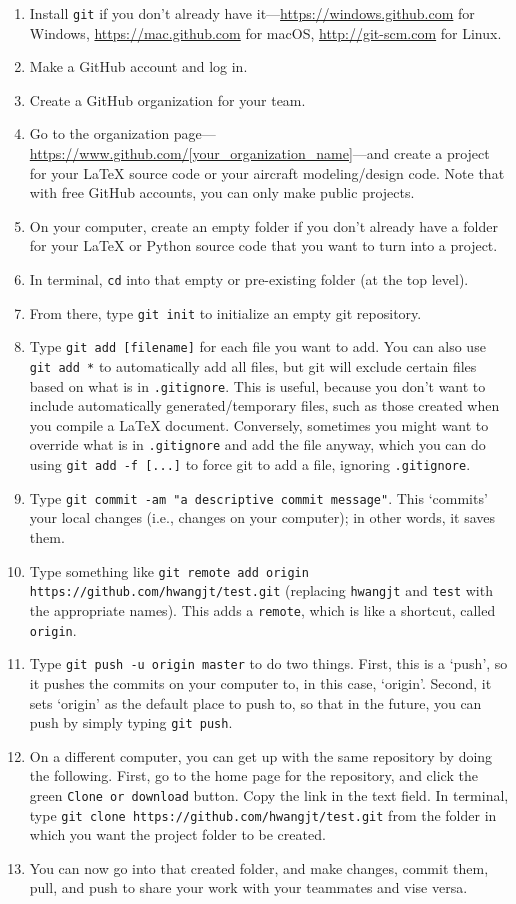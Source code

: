 \documentclass{article}
\begin{document}
\begin{enumerate}
    \item Install \texttt{git} if you don't already have it---\url{https://windows.github.com} for Windows, \url{https://mac.github.com} for macOS, \url{http://git-scm.com} for Linux.
    \item Make a GitHub account and log in.
    \item Create a GitHub organization for your team.
    \item Go to the organization page---\url{https://www.github.com/[your\_organization\_name]}---and create a project for your LaTeX source code or your aircraft modeling/design code. Note that with free GitHub accounts, you can only make public projects.
    \item On your computer, create an empty folder if you don't already have a folder for your LaTeX or Python source code that you want to turn into a project.
    \item In terminal, \texttt{cd} into that empty or pre-existing folder (at the top level).
    \item From there, type \texttt{git init} to initialize an empty git repository.
    \item Type \texttt{git add [filename]} for each file you want to add. You can also use \texttt{git add *} to automatically add all files, but git will exclude certain files based on what is in \texttt{.gitignore}. This is useful, because you don't want to include automatically generated/temporary files, such as those created when you compile a LaTeX document. Conversely, sometimes you might want to override what is in \texttt{.gitignore} and add the file anyway, which you can do using \texttt{git add -f [...]} to force git to add a file, ignoring \texttt{.gitignore}.
    \item Type \texttt{git commit -am "a descriptive commit message"}. This `commits' your local changes (i.e., changes on your computer); in other words, it saves them.
    \item Type something like \texttt{git remote add origin https://github.com/hwangjt/test.git} (replacing \texttt{hwangjt} and \texttt{test} with the appropriate names). This adds a \texttt{remote}, which is like a shortcut, called \texttt{origin}.
    \item Type \texttt{git push -u origin master} to do two things. First, this is a `push', so it pushes the commits on your computer to, in this case, `origin'. Second, it sets `origin' as the default place to push to, so that in the future, you can push by simply typing \texttt{git push}.
    \item On a different computer, you can get up with the same repository by doing the following. First, go to the home page for the repository, and click the green \texttt{Clone or download} button. Copy the link in the text field. In terminal, type \texttt{git clone https://github.com/hwangjt/test.git} from the folder in which you want the project folder to be created.
    \item You can now go into that created folder, and make changes, commit them, pull, and push to share your work with your teammates and vise versa.
\end{enumerate}
\end{document}
